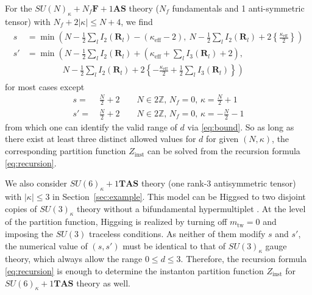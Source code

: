 \documentclass[letterpaper, 11pt]{article}
\newcommand{\nn}{\nonumber}
\def\k{\kappa}
\begin{document}
{For the $SU(N)_\kappa + N_f\mathbf{F} + 1\mathbf{AS}$ theory ($N_f$ fundamentals and 1 anti-symmetric tensor) with $N_f + 2|\kappa| \leq N+4$, we find
\begin{align}
  \label{eq:sun-nf-na}
  \begin{split}
  s &= \min  
  \left(N - \frac{1}{2} \sum_{l}I_2(\mathbf{R}_l) - (\k_\text{eff}-2),\ N - \frac{1}{2} \sum_{l}I_2(\mathbf{R}_l) + 2 \left\{\frac{\k_\text{eff}}{2}\right\}\right) \\
  s' &= \min  
  \left(N - \frac{1}{2} \sum_{l}I_2(\mathbf{R}_l) + \left(\k_\text{eff}+\sum_{l}I_3(\mathbf{R}_l)+2\right),\right. \\& \left. \qquad \qquad \  N - \frac{1}{2} \sum_{l}I_2(\mathbf{R}_l) + 2\left\{-\frac{\k_\text{eff}}{2}+\frac{1}{2}\sum_{l}I_3(\mathbf{R}_l) \right\}\right)
  \end{split} 
\end{align} for most cases except
\begin{align}
s=&\,\frac{N}{2}+2 \qquad N\in2\mathbb{Z},\,N_f=0,\,\kappa=\frac{N}{2}+1\nn\\
s'=&\,\frac{N}{2}+2 \qquad N\in2\mathbb{Z},\,N_f=0,\,\kappa=-\frac{N}{2}-1
\end{align}
from which one can identify the valid range of $d$ via \eqref{eq:bound}. 
So as long as there exist at least three distinct allowed values for $d$ for given $(N, \kappa)$, the corresponding partition function $Z_{\text{inst}}$ can be solved from the recursion formula \eqref{eq:recursion}. 

We also consider $SU(6)_\kappa  + 1 \mathbf{TAS}$ theory (one rank-3 antisymmetric tensor) with $|\kappa| \leq 3$ in Section~\ref{sec:example}. This model can be Higgsed to two disjoint copies of $SU(3)_\kappa$ theory without a bifundamental hypermultiplet \cite{Hayashi:2019yxj}. At the level of the partition function, Higgsing is realized by turning off $m_\text{tw} = 0$ and imposing the $SU(3)$ traceless conditions. As neither of them modify $s$ and $s'$, the numerical value of $(s,s')$ must be identical to that of $SU(3)_\kappa$ gauge theory, which always allow the range $0\leq d \leq 3$. Therefore, the recursion formula \eqref{eq:recursion} is enough to determine the instanton partition function $Z_{\text{inst}}$ for $SU(6)_\kappa  + 1 \mathbf{TAS}$ theory as well.

}
\end{document}
